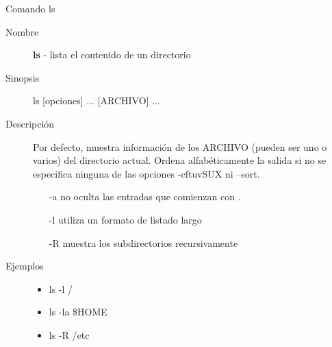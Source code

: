 \begin{frame}[c]{Comando ls}
  \begin{description}
    \item[Nombre]
      \textbf{ls} - lista el contenido de un directorio

    \vspace{\baselineskip}
    \item[Sinopsis]
      ls [opciones] ... [ARCHIVO] ...

    \vspace{\baselineskip}
    \item[Descripción]
      Por  defecto,  muestra  información de los ARCHIVO (pueden ser uno o
      varios) del directorio actual. Ordena alfabéticamente la salida si no
      se especifica ninguna de las opciones -cftuvSUX ni --sort.

      \begin{itemize}
        \item [-a] no oculta las entradas que comienzan con .
        \item [-l] utiliza un formato de listado largo
        \item [-R] muestra los subdirectorios recursivamente
      \end{itemize}

    \vspace{\baselineskip}
    \item[Ejemplos]
      \begin{itemize}
        \item ls -l  /
        \item ls -la \$HOME
        \item ls -R  /etc
      \end{itemize}
  \end{description}
\end{frame}

